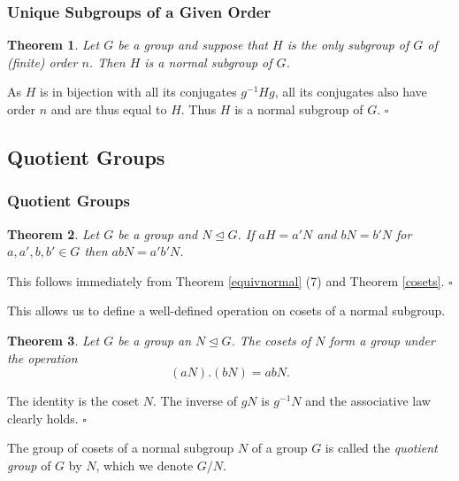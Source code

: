 \documentclass[10pt]{article}
\newtheorem{theorem}{Theorem}[section]
\newenvironment{proof}[1][Proof]{\begin{trivlist}
\item[\hskip \labelsep {\itshape #1}]}{\end{trivlist}}
\newenvironment{definition}[1][Definition]{\begin{trivlist}
\item[\hskip \labelsep {\bfseries #1}]}{\end{trivlist}}
\begin{document}
\subsubsection{Unique Subgroups of a Given Order}

\begin{theorem}
Let $G$ be a group and suppose that $H$ is the only subgroup of $G$ of (finite) order $n$. Then $H$ is a normal subgroup of $G$.
\end{theorem}

\begin{proof}
As $H$ is in bijection with all its conjugates $g^{-1}Hg$, all its conjugates also have order $n$ and are thus equal to $H$. Thus $H$ is a normal subgroup of $G$. $\square$
\end{proof}

\subsection{Quotient Groups}

\subsubsection{Quotient Groups}

\begin{theorem}
Let $G$ be a group and $N \mathrel{\unlhd} G$. If $aH = a'N$ and $bN = b'N$ for $a, a', b, b' \in G$ then $abN = a'b'N$.
\end{theorem}

\begin{proof}
This follows immediately from Theorem \ref{equivnormal} (7) and Theorem \ref{cosets}. $\square$
\end{proof}

This allows us to define a well-defined operation on cosets of a normal subgroup.

\begin{theorem}
Let $G$ be a group an $N \mathrel{\unlhd} G$. The cosets of $N$ form a group under the operation
$$(aN).(bN) = abN.$$
\end{theorem}

\begin{proof}
The identity is the coset $N$. The inverse of $gN$ is $g^{-1}N$ and the associative law clearly holds. $\square$
\end{proof}

\begin{definition}
The group of cosets of a normal subgroup $N$ of a group $G$ is called the \emph{quotient group} of $G$ by $N$, which we denote $G/N$.
\end{definition}
\end{document}
